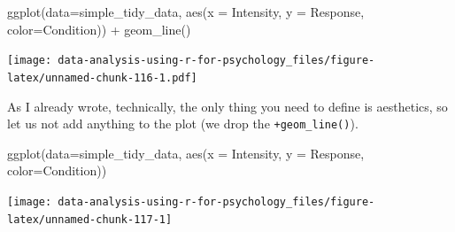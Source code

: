 \documentclass[
]{book}
\newenvironment{Shaded}{\begin{snugshade}}{\end{snugshade}}
\newcommand{\AttributeTok}[1]{\textcolor[rgb]{0.77,0.63,0.00}{#1}}
\newcommand{\FunctionTok}[1]{\textcolor[rgb]{0.00,0.00,0.00}{#1}}
\newcommand{\NormalTok}[1]{#1}
\newcommand{\SpecialCharTok}[1]{\textcolor[rgb]{0.00,0.00,0.00}{#1}}
\begin{document}
\begin{Shaded}
\begin{Highlighting}[]
\FunctionTok{ggplot}\NormalTok{(}\AttributeTok{data=}\NormalTok{simple\_tidy\_data, }\FunctionTok{aes}\NormalTok{(}\AttributeTok{x =}\NormalTok{ Intensity, }\AttributeTok{y =}\NormalTok{ Response, }\AttributeTok{color=}\NormalTok{Condition)) }\SpecialCharTok{+} 
  \FunctionTok{geom\_line}\NormalTok{()}
\end{Highlighting}
\end{Shaded}

\texttt{[image: data-analysis-using-r-for-psychology\_files/figure-latex/unnamed-chunk-116-1.pdf]}

As I already wrote, technically, the only thing you need to define is aesthetics, so let us not add anything to the plot (we drop the \texttt{+geom\_line()}).

\begin{Shaded}
\begin{Highlighting}[]
\FunctionTok{ggplot}\NormalTok{(}\AttributeTok{data=}\NormalTok{simple\_tidy\_data, }\FunctionTok{aes}\NormalTok{(}\AttributeTok{x =}\NormalTok{ Intensity, }\AttributeTok{y =}\NormalTok{ Response, }\AttributeTok{color=}\NormalTok{Condition))}
\end{Highlighting}
\end{Shaded}

\begin{center}\texttt{[image: data-analysis-using-r-for-psychology\_files/figure-latex/unnamed-chunk-117-1]} \end{center}
\end{document}
